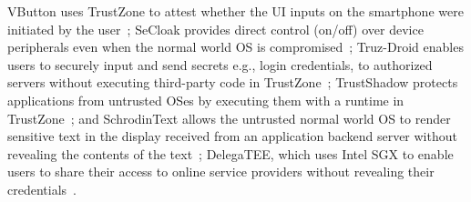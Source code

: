 VButton uses TrustZone to attest whether the UI inputs on the smartphone were
initiated by the user~\cite{li18vbutton}; SeCloak provides direct control
(on/off) over device peripherals even when the normal world OS is
compromised~\cite{lentz18secloak}; Truz-Droid enables users to securely input
and send secrets e.g., login credentials, to authorized servers without
executing third-party code in TrustZone~\cite{ying18truzdroid}; TrustShadow
protects applications from untrusted OSes by executing them with a runtime in
TrustZone~\cite{guan17trustshadow}; and SchrodinText allows the untrusted normal
world OS to render sensitive text in the display received from an application
backend server without revealing the contents of the
text~\cite{sani17schrodintext}; DelegaTEE, which uses Intel SGX to enable users
to share their access to online service providers without revealing their
credentials~\cite{matetic18delegatee}.

